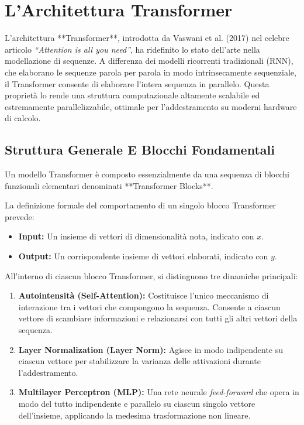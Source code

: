 ﻿\documentclass[11pt, a4paper]{article}
\begin{document}
\section{L'Architettura Transformer}
L'architettura **Transformer**, introdotta da Vaswani et al. (2017) nel celebre articolo \emph{``Attention is all you need''}, ha ridefinito lo stato dell'arte nella modellazione di sequenze. A differenza dei modelli ricorrenti tradizionali (RNN), che elaborano le sequenze parola per parola in modo intrinsecamente sequenziale, il Transformer consente di elaborare l'intera sequenza in parallelo. Questa proprietà lo rende una struttura computazionale altamente scalabile ed estremamente parallelizzabile, ottimale per l'addestramento su moderni hardware di calcolo.

\subsection{Struttura Generale E Blocchi Fondamentali}

Un modello Transformer è composto essenzialmente da una sequenza di blocchi funzionali elementari denominati **Transformer Blocks**.


La definizione formale del comportamento di un singolo blocco Transformer prevede:
\begin{itemize}
    \item \textbf{Input:} Un insieme di vettori di dimensionalità nota, indicato con $x$.
    \item \textbf{Output:} Un corrispondente insieme di vettori elaborati, indicato con $y$.
\end{itemize}

All'interno di ciascun blocco Transformer, si distinguono tre dinamiche principali:
\begin{enumerate}
    \item \textbf{Autointensità (Self-Attention):} Costituisce l'unico meccanismo di interazione tra i vettori che compongono la sequenza. Consente a ciascun vettore di scambiare informazioni e relazionarsi con tutti gli altri vettori della sequenza.
    \item \textbf{Layer Normalization (Layer Norm):} Agisce in modo indipendente su ciascun vettore per stabilizzare la varianza delle attivazioni durante l'addestramento.
    \item \textbf{Multilayer Perceptron (MLP):} Una rete neurale \emph{feed-forward} che opera in modo del tutto indipendente e parallelo su ciascun singolo vettore dell'insieme, applicando la medesima trasformazione non lineare.
\end{enumerate}
\end{document}
